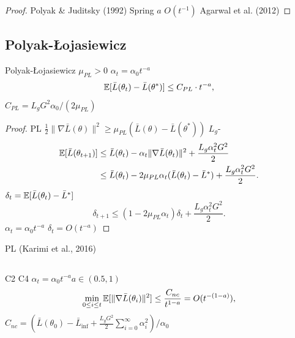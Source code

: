 \begin{proof}
 Polyak \& Juditsky (1992)  Spring  $a$  $O(t^{-1})$  Agarwal et al. (2012) 
\end{proof}

\subsection{Polyak-{\L}ojasiewicz }

\begin{theorem}[PL ]\label{thm:rate-pl}
 Polyak-{\L}ojasiewicz  $\mu_{PL} > 0$ $\alpha_t = \alpha_0 t^{-a}$
\begin{equation}
    \mathbb{E}[\bar{L}(\theta_t) - \bar{L}(\theta^*)] \leq C_{PL} \cdot t^{-a},
\end{equation}
 $C_{PL} = L_g G^2 \alpha_0 / (2\mu_{PL})$
\end{theorem}

\begin{proof}
PL  $\frac{1}{2}\|\nabla \bar{L}(\theta)\|^2 \geq \mu_{PL} (\bar{L}(\theta) - \bar{L}(\theta^*))$ $L_g$-
\begin{align}
    \mathbb{E}[\bar{L}(\theta_{t+1})] &\leq \bar{L}(\theta_t) - \alpha_t \|\nabla \bar{L}(\theta_t)\|^2 + \frac{L_g \alpha_t^2 G^2}{2} \\
    &\leq \bar{L}(\theta_t) - 2\mu_{PL}\alpha_t (\bar{L}(\theta_t) - \bar{L}^*) + \frac{L_g \alpha_t^2 G^2}{2}.
\end{align}
 $\delta_t = \mathbb{E}[\bar{L}(\theta_t) - \bar{L}^*]$
\begin{equation}
    \delta_{t+1} \leq (1 - 2\mu_{PL}\alpha_t) \delta_t + \frac{L_g \alpha_t^2 G^2}{2}.
\end{equation}
 $\alpha_t = \alpha_0 t^{-a}$  $\delta_t = O(t^{-a})$
\end{proof}

\textbf{}PL  (Karimi et al., 2016)

\subsection{}

\begin{theorem}[]\label{thm:rate-nonconvex}
 C2  C4  $\alpha_t = \alpha_0 t^{-a}$$a \in (0.5, 1)$
\begin{equation}
    \min_{0 \leq i \leq t} \mathbb{E}[\|\nabla \bar{L}(\theta_i)\|^2] \leq \frac{C_{nc}}{t^{1-a}} = O(t^{-(1-a)}),
\end{equation}
 $C_{nc} = (\bar{L}(\theta_0) - \bar{L}_{\inf} + \frac{L_g G^2}{2} \sum_{i=0}^\infty \alpha_i^2) / \alpha_0$
\end{theorem}

